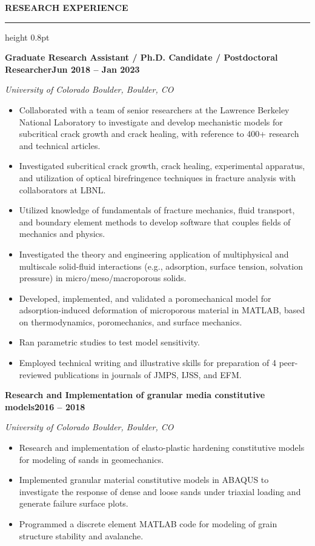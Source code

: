\documentclass[10pt, letterpaper]{article}
\newcommand{\rsection}[1]{%
  \vspace{10pt}%
  {\large\bfseries\MakeUppercase{#1}}%
  \vspace{1pt}%
  \hrule height 0.8pt%
  \vspace{5pt}%
}
\newcommand{\jobline}[2]{%
  \vspace{5pt}%
  \noindent\textbf{#1}\hfill\textbf{#2}\par%
  \vspace{1pt}%
}
\newcommand{\subline}[1]{%
  \vspace{-1pt}%
  \noindent\textit{#1}\par%
  \vspace{1pt}%
}
\newenvironment{rlist}{%
  \begin{itemize}[leftmargin=1.4em, itemsep=1pt, topsep=2pt, parsep=0pt]%
}{%
  \end{itemize}%
}
\begin{document}
\rsection{Research Experience}

\jobline{Graduate Research Assistant / Ph.D. Candidate / Postdoctoral Researcher}{Jun 2018 -- Jan 2023}
\subline{University of Colorado Boulder, Boulder, CO}
\begin{rlist}
  \item Collaborated with a team of senior researchers at the Lawrence Berkeley National Laboratory to investigate and develop mechanistic models for subcritical crack growth and crack healing, with reference to 400+ research and technical articles.
  \item Investigated subcritical crack growth, crack healing, experimental apparatus, and utilization of optical birefringence techniques in fracture analysis with collaborators at LBNL.
  \item Utilized knowledge of fundamentals of fracture mechanics, fluid transport, and boundary element methods to develop software that couples fields of mechanics and physics.
  \item Investigated the theory and engineering application of multiphysical and multiscale solid-fluid interactions (e.g., adsorption, surface tension, solvation pressure) in micro/meso/macroporous solids.
  \item Developed, implemented, and validated a poromechanical model for adsorption-induced deformation of microporous material in MATLAB, based on thermodynamics, poromechanics, and surface mechanics.
  \item Ran parametric studies to test model sensitivity.
  \item Employed technical writing and illustrative skills for preparation of 4 peer-reviewed publications in journals of JMPS, IJSS, and EFM.
\end{rlist}

\jobline{Research and Implementation of granular media constitutive models}{2016 -- 2018}
\subline{University of Colorado Boulder, Boulder, CO}
\begin{rlist}
  \item Research and implementation of elasto-plastic hardening constitutive models for modeling of sands in geomechanics.
  \item Implemented granular material constitutive models in ABAQUS to investigate the response of dense and loose sands under triaxial loading and generate failure surface plots.
  \item Programmed a discrete element MATLAB code for modeling of grain structure stability and avalanche.
\end{rlist}
\end{document}
